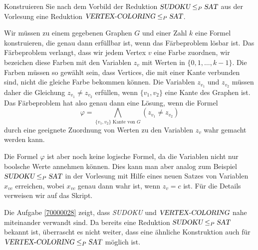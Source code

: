 Konstruieren Sie nach dem Vorbild der Reduktion
$\textsl{SUDOKU}\le_P\textsl{SAT}$ aus der Vorlesung eine
Reduktion
$\textsl{VERTEX-COLORING}\le_P\textsl{SAT}$.


\begin{loesung}
Wir müssen zu einem gegebenen Graphen $G$ und einer Zahl $k$ eine
Formel konstruieren, die genau dann erfüllbar ist, wenn das Färbeproblem
lösbar ist. Das Färbeproblem verlangt, dass wir jedem Vertex $v$ eine
Farbe zuordnen, wir bezeichen diese Farben mit den Variablen $z_v$
mit Werten in $\{0,1,\dots,k-1\}$.
Die Farben müssen so gewählt sein, dass Vertices, die mit einer Kante
verbunden sind, nicht die gleiche Farbe bekommen können. Die Variablen
$z_{v_1}$ und $z_{v_2}$ müssen daher die Gleichung $z_{v_1}\ne z_{v_2}$
erfüllen, wenn $\{v_1,v_2\}$ eine Kante des Graphen ist. Das Färbeproblem
hat also genau dann eine Lösung, wenn die Formel
\[
\varphi =\bigwedge_{\text{$\{v_1,v_2\}$ Kante von $G$}} (z_{v_1}\ne z_{v_2})
\]
durch eine geeignete Zuordnung von Werten zu den Variablen $z_v$ wahr gemacht
werden kann.

Die Formel $\varphi$ ist aber noch keine logische Formel, da die Variablen
nicht nur boolsche Werte annehmen können.
Dies kann man aber analog zum Beispiel $\textsl{SUDOKU}\le_P\textsl{SAT}$
in der Vorlesung mit Hilfe eines neuen Satzes von Variablen $x_{vc}$
erreichen, wobei $x_{vc}$ genau dann wahr ist, wenn $z_v=c$ ist.
Für die Details verweisen wir auf das Skript.
\end{loesung}

\begin{diskussion}
Die Aufgabe \ref{70000028} zeigt, dass \textsl{SUDOKU} und 
$\textsl{VERTEX-COLORING}$ nahe miteinander verwandt sind.
Da bereits eine Reduktion $\textsl{SUDOKU}\le_P\textsl{SAT}$
bekannt ist, überrascht es nicht weiter, dass eine ähnliche
Konstruktion auch für
$\textsl{VERTEX-COLORING}\le_P\textsl{SAT}$
möglich ist.
\end{diskussion}


